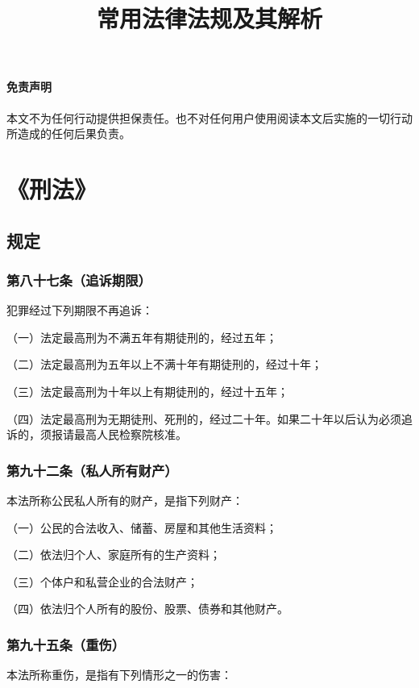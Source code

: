 \documentclass[utf-8,10pt]{ctexart}
\title{\textbf{常用法律法规及其解析}}
\begin{document}
\setcounter{page}{0}
\maketitle
\thispagestyle{empty}
\newpage
\pagestyle{fancy}
\tableofcontents
\newpage{}
\paragraph{}
\noindent{}
\paragraph{免责声明}
本文不为任何行动提供担保责任。也不对任何用户使用阅读本文后实施的一切行动所造成的任何后果负责。
\section{《刑法》}
\subsection{规定}
\subsubsection{第八十七条（追诉期限）}
 犯罪经过下列期限不再追诉：

（一）法定最高刑为不满五年有期徒刑的，经过五年；

（二）法定最高刑为五年以上不满十年有期徒刑的，经过十年；

（三）法定最高刑为十年以上有期徒刑的，经过十五年；

（四）法定最高刑为无期徒刑、死刑的，经过二十年。如果二十年以后认为必须追诉的，须报请最高人民检察院核准。
\subsubsection{第九十二条（私人所有财产）}
本法所称公民私人所有的财产，是指下列财产：

（一）公民的合法收入、储蓄、房屋和其他生活资料；

（二）依法归个人、家庭所有的生产资料；

（三）个体户和私营企业的合法财产；

（四）依法归个人所有的股份、股票、债券和其他财产。
\subsubsection{第九十五条（重伤）}
本法所称重伤，是指有下列情形之一的伤害：
\end{document}

